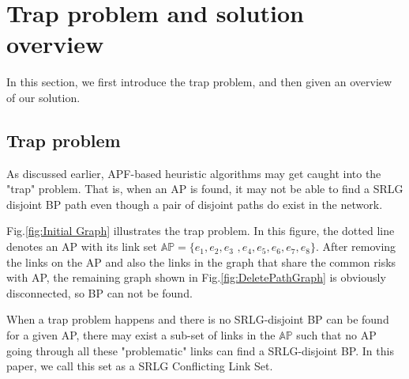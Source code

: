\section{Trap problem and solution overview }
\label{sec:Trap problem and solution overview }

In this section, we first introduce the trap problem, and then given an overview of our solution.
\subsection{Trap problem}

As discussed earlier, APF-based heuristic algorithms may get caught into the "trap" problem. That is, when an AP is found, it may not be able to find a SRLG disjoint BP path even though a pair of disjoint paths do exist in the network.


Fig.\ref{fig:Initial Graph} illustrates the trap problem. In this figure, the dotted line denotes an AP with its link set
$\mathbb{AP}=\{e_1,e_2,e_3$
$,e_4,e_5,e_6,e_7,e_8\}$. After removing the links on the AP and also the links in the graph that share the common risks with AP, the remaining graph shown in Fig.\ref{fig:DeletePathGraph} is obviously disconnected, so BP can not be found.

When a trap problem happens and there is no SRLG-disjoint BP can be found for a given AP, there may exist a sub-set of links in the $\mathbb{AP}$ such that no AP going through all these "problematic" links can find a SRLG-disjoint BP. In this paper, we call this set as a SRLG Conflicting Link Set.

